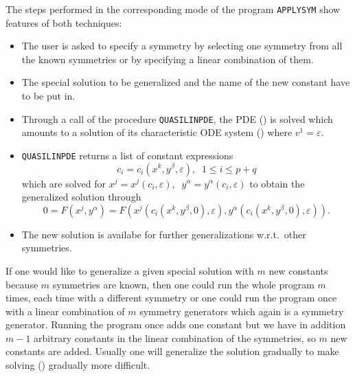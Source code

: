 The steps performed in the corresponding mode of the
program \texttt{APPLYSYM} show features of both techniques:
\begin{itemize}
\item The user is asked to specify a symmetry by selecting one symmetry
from all the known symmetries or by specifying a linear combination of them.
\item The special solution to be generalized and the name of the new
constant have to be put in.
\item Through a call of the procedure \texttt{QUASILINPDE}, the PDE ()
is solved which amounts to a solution of its characteristic ODE system
() where $v^1=\varepsilon$.
\item \texttt{QUASILINPDE} returns a list of constant expressions
\begin{equation}
c_i = c_i(x^k, y^\beta, \varepsilon),\;\;1\leq i\leq p+q
\end{equation}
which are solved for
$x^j=x^j(c_i,\varepsilon),\;\; y^\alpha=y^\alpha(c_i,\varepsilon)$
to obtain the generalized solution through
\[ 0 = F(x^j, y^\alpha)
     = F(     x^j(c_i(x^k, y^\beta, 0), \varepsilon),
         y^\alpha(c_i(x^k, y^\beta, 0), \varepsilon)). \]
\item The new solution is availabe for further generalizations w.r.t.\ other
symmetries.
\end{itemize}
If one would like to generalize a given special solution with $m$ new
constants because $m$ symmetries are known, then one could run the whole
program $m$ times, each time with a different symmetry or one could run the
program once with a linear combination of $m$ symmetry generators which
again is a symmetry generator. Running the program once adds one constant
but we have in addition $m-1$ arbitrary constants in the linear combination
of the symmetries, so $m$ new constants are added.
Usually one will generalize the solution gradually to make solving
() gradually more difficult.

